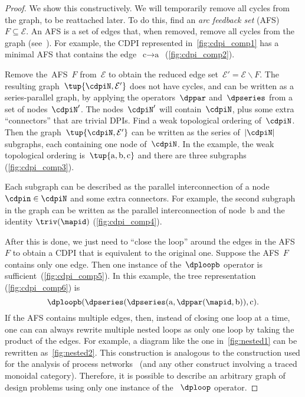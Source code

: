 \begin{proof}
    We show this constructively.
    We will temporarily remove all cycles from the graph, to be reattached later.
    To do this, find an \emph{arc feedback set} (AFS) $F\subseteq\mathcal{E}$.
    An AFS is a set of edges that, when removed, remove all cycles from the graph (see~\cite{golovach15incremental}).
    For example, the CDPI represented in~\cref{fig:cdpi_comp1} has a minimal AFS that contains the edge~$\text{c}\rightarrow\text{a}$~(\cref{fig:cdpi_comp2}).

    Remove the~AFS~$F$ from~$\mathcal{E}$ to obtain the reduced edge set~$\mathcal{E}'=\mathcal{E}\backslash F$.
    The resulting graph~$\tup{ \cdpiN,\mathcal{E}'} $ does not have cycles, and can be written as a series-parallel graph, by applying the operators~$\dppar$ and~$\dpseries$ from a set of nodes~$\cdpiN'$.
    The nodes~$\cdpiN'$ will contain~$\cdpiN$, plus some extra ``connectors'' that are trivial DPIs.
    Find a weak topological ordering of~$\cdpiN$.
    Then the graph~$\tup{ \cdpiN,\mathcal{E}'} $ can be written as the series of~$|\cdpiN|$ subgraphs, each containing one node of~$\cdpiN$.
    In the example, the weak topological ordering is~$\tup{ \text{a},\text{b},\text{c}} $ and there are three subgraphs (\cref{fig:cdpi_comp3}).


    Each subgraph can be described as the parallel interconnection of a node~$\cdpin\in\cdpiN$ and some extra connectors.
    For example, the second subgraph in the graph can be written as the parallel interconnection of node~$\text{b}$ and the identity $\triv(\mapid)$ (\cref{fig:cdpi_comp4}).


    After this is done, we just need to ``close the loop'' around the edges in the AFS~$F$ to obtain a CDPI that is equivalent to the original one.
    Suppose the AFS~$F$ contains only one edge.
    Then one instance of the~$\dploopb$ operator is sufficient~(\cref{fig:cdpi_comp5}).
    In this example, the tree representation (\cref{fig:cdpi_comp6}) is
    \begin{equation*}
        \dploopb(\dpseries(\dpseries(\text{a},\dppar(\mapid,\text{b})),\text{c}).
    \end{equation*}
    If the AFS contains multiple edges, then, instead of closing one loop at a time, one can can always rewrite multiple nested loops as only one loop by taking the product of the edges.
    For example, a diagram like the one in~\cref{fig:nested1} can be rewritten as~\cref{fig:nested2}.
    This construction is analogous to the construction used for the analysis of process networks~\cite{lee10} (and any other construct involving a traced monoidal category).
    Therefore, it is possible to describe an arbitrary graph of design problems using only one instance of the ~$\dploop$ operator.
\end{proof}

